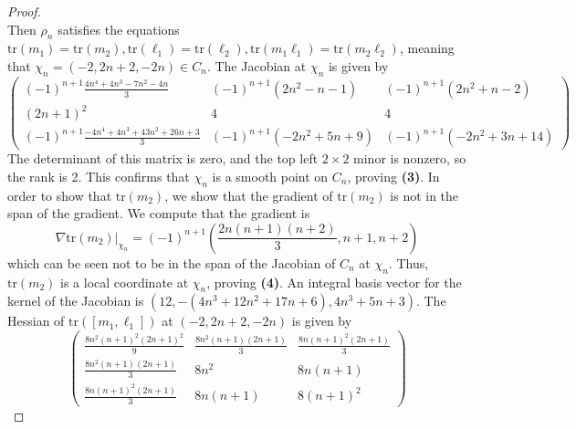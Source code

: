 \documentclass[10pt,a4paper]{amsart}
\begin{document}
\begin{proof}
\begin{equation}
\end{equation}
Then $\rho_n$ satisfies the equations $\text{tr}(m_1) = \text{tr}(m_2), \text{tr}(\ell_1) = \text{tr}(\ell_2), \text{tr}(m_1\ell_1) = \text{tr}(m_2\ell_2)$, meaning that $\chi_n = (-2, 2n+2, -2n) \in C_n$. The Jacobian at $\chi_n$ is given by 
\begin{equation}
	\begin{pmatrix}(-1)^{n+1}\frac{4n^4 + 4n^3 - 7n^2 - 4n}{3} & (-1)^{n+1}(2n^2 - n - 1) & (-1)^{n+1}(2n^2 + n - 2) \\ (2n+1)^2 & 4 & 4 \\ (-1)^{n+1}\frac{-4n^4 + 4n^3 + 43n^2 + 26n + 3}{3} & (-1)^{n+1}(-2n^2 + 5n + 9) & (-1)^{n+1}(-2n^2 + 3n + 14) \end{pmatrix}
\end{equation}
The determinant of this matrix is zero, and the top left $2 \times 2$ minor is nonzero, so the rank is 2. This confirms that $\chi_n$ is a smooth point on $C_n$, proving \textbf{(3)}. In order to show that $\text{tr}(m_2)$, we show that the gradient of $\text{tr}(m_2)$ is not in the span of the gradient. We compute that the gradient is 
\begin{equation}
	\nabla \text{tr}(m_2)|_{\chi_n} = (-1)^{n+1}\left(\frac{2n(n+1)(n+2)}{3}, n+1, n+2\right)
\end{equation}
which can be seen not to be in the span of the Jacobian of $C_n$ at $\chi_n$. Thus, $\text{tr}(m_2)$ is a local coordinate at $\chi_n$, proving \textbf{(4)}. An integral basis vector for the kernel of the Jacobian is $(12, -(4n^3 + 12n^2 + 17n + 6), 4n^3 + 5n + 3)$. The Hessian of $\text{tr}([m_1, \ell_1])$ at $(-2, 2n+2, -2n)$ is given by 
\begin{equation}
	\begin{pmatrix}\frac{8n^2(n+1)^2(2n+1)^2}{9} & \frac{8n^2(n+1)(2n+1)}{3} & \frac{8n(n+1)^2(2n+1)}{3} \\ \frac{8n^2(n+1)(2n+1)}{3} & 8n^2 & 8n(n+1) \\ \frac{8n(n+1)^2(2n+1)}{3} & 8n(n+1) & 8(n+1)^2\end{pmatrix}
\end{equation}

\end{proof}
\end{document}
